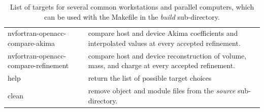 \begin{table}[H]
\begin{centering}
\begin{tabular}{p{}p{}}
nvfortran-openacc-compare-akima & compare host and device Akima coefficients
and interpolated values at every accepted refinement.\tabularnewline
nvfortran-openacc-compare-refinement & compare host and device reconstruction of
volume, mass, and charge at every accepted refinement.\tabularnewline
help  & return the list of possible target choices\tabularnewline
clean  & remove object and module files from the \textit{source} sub-directory.\tabularnewline
\hline
\end{tabular}
\par\end{centering}
\protect\caption{List of targets for several common workstations and parallel computers,
which can be used with the Makefile in the \textit{build} sub-directory.}

\label{Tab:targets}
\end{table}
